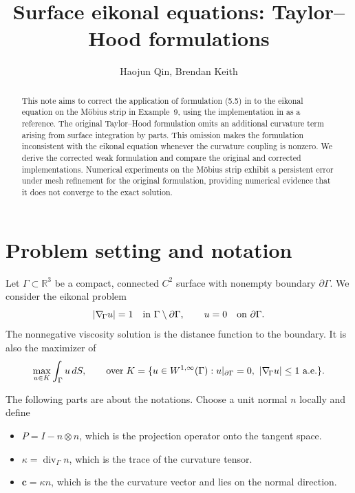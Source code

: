 \documentclass[11pt,a4paper]{article}
\title{Surface eikonal equations:
Taylor--Hood formulations}
\author{Haojun Qin, Brendan Keith}
\date{}
\newcommand{\G}{\Gamma}
\newcommand{\gradG}{\nabla_{\!\G}}
\newcommand{\divG}{\operatorname{div}_{\G}}
\newcommand{\cv}{\mathbf c}
\newcommand{\R}{\mathbb R}
\begin{document}
\maketitle

\begin{abstract}
This note aims to correct the application of formulation (5.5) in
\cite{lvpp} to the eikonal equation on the M\"obius strip in
Example~9, using the implementation in \cite{upstream} as a reference.
The original Taylor--Hood formulation omits an additional
curvature term arising from surface integration by parts. This omission
makes the formulation inconsistent with the eikonal equation
whenever the curvature coupling is nonzero.
We derive the corrected weak formulation and compare the original and
corrected implementations. Numerical experiments on the M\"obius strip
exhibit a persistent error under mesh refinement for the original
formulation, providing numerical evidence that it does not converge
to the exact solution.
\end{abstract}

\vspace{-5mm}
\section{Problem setting and notation}
\label{sec:notation}

Let $\G\subset\R^3$ be a compact, connected $C^2$ surface with nonempty boundary $\partial\G$. We consider the eikonal problem
\begin{equation}
  |\gradG u|=1\quad\hbox{in }\G\setminus\partial\G,
  \qquad u=0\quad\hbox{on }\partial\G.
  \label{eq:eikonal}
\end{equation}
The nonnegative viscosity solution is the distance function to the boundary. It is also the maximizer of
\begin{equation}
  \max_{u\in K}\int_\G u\,dS,\qquad \text{over} \;
  K=\{u\in W^{1,\infty}(\G):u|_{\partial\G}=0,
          \ |\gradG u|\leq1\ \hbox{a.e.}\}.
  \label{eq:variational}
\end{equation}

\bigskip

The following parts are about the notations.
Choose a unit normal $n$ locally and define
\begin{itemize}
    \item $P=I-n\otimes n$, which is the projection operator onto the tangent space.
    \item $\kappa=\divG n$, which is the trace of the curvature tensor.
    \item $\cv=\kappa n$, which is the the curvature vector and lies on the normal direction.
\end{itemize}
\end{document}

